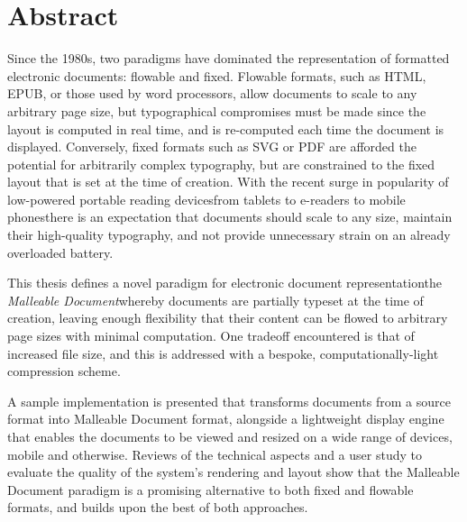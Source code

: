 \cleardoublepage
\begingroup
\let\clearpage\relax
\let\cleardoublepage\relax
\let\cleardoublepage\relax

\chapter*{Abstract}

Since the 1980s, two paradigms have dominated the representation of formatted electronic documents: flowable and fixed. Flowable formats, such as HTML, EPUB, or those used by word processors, allow documents to scale to any arbitrary page size, but typographical compromises must be made since the layout is computed in real time, and is re-computed each time the document is displayed. Conversely, fixed formats such as SVG or PDF are afforded the potential for arbitrarily complex typography, but are constrained to the fixed layout that is set at the time of creation. With the recent surge in popularity of low-powered portable reading devices\ed{}from tablets to e-readers to mobile phones\ed{}there is an expectation that documents should scale to any size, maintain their high-quality typography, and not provide unnecessary strain on an already overloaded battery.

This thesis defines a novel paradigm for electronic document representation\ed{}the \emph{Malleable Document}\ed{}whereby documents are partially typeset at the time of creation, leaving enough flexibility that their content can be flowed to arbitrary page sizes with minimal computation. One tradeoff encountered is that of increased file size, and this is addressed with a bespoke, computationally-light compression scheme.

A sample implementation is presented that transforms documents from a source format into Malleable Document format, alongside a lightweight display engine that enables the documents to be viewed and resized on a wide range of devices, mobile and otherwise. Reviews of the technical aspects and a user study to evaluate the quality of the system's rendering and layout show that the Malleable Document paradigm is a promising alternative to both fixed and flowable formats, and builds upon the best of both approaches.


\endgroup

\vfill
